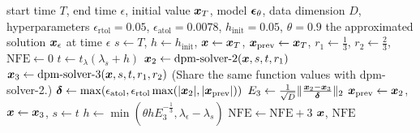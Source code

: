 \begin{algorithm}[htbp]
\centering
\caption{(\textbf{DPM-Solver-23}) Adaptive step size algorithm by combining DPM-Solver-2 and 3.}\label{algorithm:dpm_solver_23}
\begin{algorithmic}[1]
\Require start time $T$, end time $\epsilon$, initial value $\bm{x}_T$, model $\bm{\epsilon}_\theta$, data dimension $D$, hyperparameters $\epsilon_{\text{rtol}}=0.05$, $\epsilon_{\text{atol}}=0.0078$, $h_{\text{init}}=0.05$, $\theta=0.9$
\Ensure the approximated solution $\bm{x}_{\epsilon}$ at time $\epsilon$
\State $s\gets T$, $h\gets h_{\text{init}}$, $\bm{x}\gets \bm{x}_T$, $\bm{x}_{\text{prev}}\gets \bm{x}_T$, $r_1\gets \frac{1}{3}$, $r_2\gets \frac{2}{3}$, $\text{NFE}\gets 0$
    \State $t\gets t_{\lambda}(\lambda_s + h)$
    \State $\bm{x}_2\gets \text{dpm-solver-2}(\bm{x}, s, t, r_1)$
    \State $\bm{x}_3\gets \text{dpm-solver-3}(\bm{x}, s, t, r_1, r_2)$ (Share the same function values with dpm-solver-2.)
    \State $\bm{\delta} \gets \max(\epsilon_{\text{atol}}, \epsilon_{\text{rtol}}\max(|\bm{x}_2|, |\bm{x}_{\text{prev}}|))$
    \State $E_3\gets \frac{1}{\sqrt{D}}\|\frac{\bm{x}_2-\bm{x}_3}{\bm{\delta}}\|_2$
        \State $\bm{x}_{\text{prev}}\gets \bm{x}_2$, $\bm{x}\gets \bm{x}_3$, $s\gets t$
    \EndIf
    \State $h\gets \min(\theta h E_3^{-\frac{1}{3}}, \lambda_{\epsilon} - \lambda_s)$
    \State $\text{NFE}\gets \text{NFE} + 3$
\EndWhile
\State \Return $\bm{x}$, $\text{NFE}$

\end{algorithmic}
\end{algorithm}


